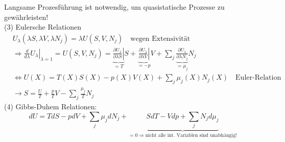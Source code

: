 \documentclass[10pt]{scrartcl}
\begin{document}
\begin{fleqn}
Langsame Prozesführung ist notwendig, um quasistatische Prozesse zu gewährleisten!\\
(3) Eulersche Relationen
  \begin{equation}
  \begin{aligned}
  &U_\lambda(\lambda S,\lambda V,\lambda N_j)=\lambda U(S,V,N_j) \quad \text{wegen Extensivität}\\
  &\Rightarrow \left.\frac{d}{d\lambda}U_\lambda\right|_{\lambda = 1} =U(S,V,N_j) = \underbrace{\left.\frac{\partial U_\lambda}{\partial \lambda S}\right|}_{=T} S +\underbrace{\left.\frac{\partial U_\lambda}{\partial \lambda V}\right|}_{=-p} V +\sum_j \underbrace{\frac{\partial U_\lambda}{\partial \lambda N_j}}_{=\mu_j} N_j\\
  &\Leftrightarrow U(X) =T(X)S(X)-p(X)V(X)+\sum_j \mu_j(X) N_j(X) \quad \text{Euler-Relation}\\
  &\rightarrow S= \frac{U}{T}+\frac{p}{T}V -\sum_j\frac{\mu_j}{T}N_j
  \end{aligned}
  \end{equation}
(4) Gibbs-Duhem Relationen:
  \begin{equation}
   dU=TdS -pdV+\sum_j\mu_jdN_j +\underbrace{SdT-Vdp+\sum_jN_jd\mu_j}_{=0\Rightarrow\text{nicht alle int. Variablen sind unabhängig!}}
  \end{equation}

\end{fleqn}
\end{document}
